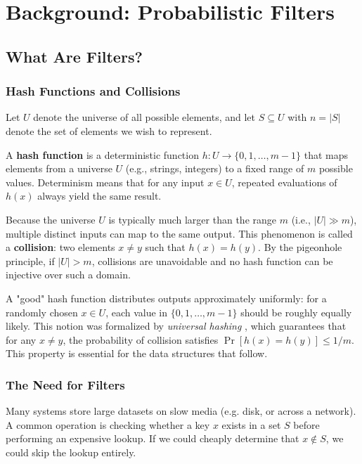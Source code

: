 
\chapter{Background: Probabilistic Filters}

\section{What Are Filters?}

\subsection{Hash Functions and Collisions}

Let $U$ denote the universe of all possible elements, and let $S \subseteq U$ 
with $n = |S|$ denote the set of elements we wish to represent.

A \textbf{hash function} is a deterministic function $h : U \to \{0, 1, \dots, m-1\}$ 
that maps elements from a universe $U$ (e.g., strings, integers) to a fixed range of 
$m$ possible values. Determinism means that for any input $x \in U$, repeated 
evaluations of $h(x)$ always yield the same result.

Because the universe $U$ is typically much larger than the range $m$ 
(i.e., $|U| \gg m$), multiple distinct inputs can map to the same output. 
This phenomenon is called a \textbf{collision}: two elements $x \neq y$ such that 
$h(x) = h(y)$. By the pigeonhole principle, if $|U| > m$, collisions are 
unavoidable and no hash function can be injective over such a domain.

A "good" hash function distributes outputs approximately uniformly: for a 
randomly chosen $x \in U$, each value in $\{0, 1, \dots, m-1\}$ should be 
roughly equally likely. This notion was formalized by \textit{universal hashing} \cite{carter},  which guarantees that for any 
$x \neq y$, the probability of collision satisfies 
$\Pr[h(x) = h(y)] \leq 1/m$. This property is essential for the 
data structures that follow.

\subsection{The Need for Filters}

Many systems store large datasets on slow media (e.g. disk, or across a 
network). A common operation is checking whether a key $x$ exists in a set $S$ 
before performing an expensive lookup. If we could cheaply determine that 
$x \notin S$, we could skip the lookup entirely.

